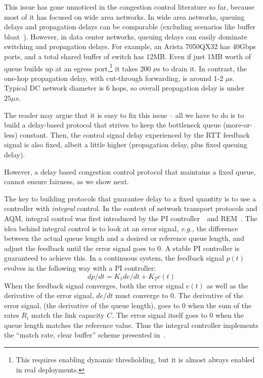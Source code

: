 This issue has gone unnoticed in the congestion control literature so far,
because most of it has focused on wide area networks.  In wide area networks,
queuing delays and propagation delays can be comparable (excluding scenarios
like buffer bloat~\cite{bufferbloat}). However, in data center networks, queuing
delays can easily dominate switching and propagation delays.  For example, an
Arista 7050QX32 has 40Gbps ports, and a total shared buffer of switch has 12MB.
Even if just 1MB worth of queue builds up at an egress port,\footnote{This
requires enabling dynamic thresholding, but it is almost always enabled in real
deployments.} it takes 200 $\mu$s to drain it. In contrast, the one-hop
propagation delay, with cut-through forwarding, is around 1-2 $\mu$s.  Typical
DC network diameter is 6 hops, so overall propagation delay is under $25\mu s$.

The reader may argue that it is easy to fix this issue  -- all we have to do is
to build a delay-based protocol that strives to keep the  bottleneck queue
(more-or-less) constant. Then, the control signal delay experienced by the RTT
feedback signal is also fixed, albeit a little higher (propagation delay, plus
fixed queuing delay). 

However, a delay based congestion control protocol that maintains a fixed
queue, cannot ensure fairness, as we show next.

The key to building protocols that guarantee delay to a fixed quantity is to use
a controller with \emph{integral} control. In the context of network transport
protocols and AQM, integral control was first introduced by the PI
controller~\cite{hollot2001designing}~and REM~\cite{REM}.  The idea behind integral control
is to look at an error signal, {\em e.g.,} the difference between the actual queue
length and a desired or reference queue length, and adjust the feedback until
the error signal goes to 0. A stable PI controller is guaranteed to achieve
this. In a continuous system, the feedback signal $p(t)$ evolves in the
following way with a PI controller:
$${dp}/{dt} = K_1 {de}/{dt}+K_2e(t)$$
When the feedback signal converges, both the error signal $e(t)$ as
well as the derivative of the error signal, $de/dt$ must converge to
0. The derivative of the error signal, (the derivative of the queue length), goes to 0
when the sum of the rates $R_i$ match the link capacity $C$. The error signal itself goes to 0
when the queue length matches the reference value. Thus the integral
controller implements the ``match rate, clear buffer'' scheme
presented in~\cite{REM}. 

